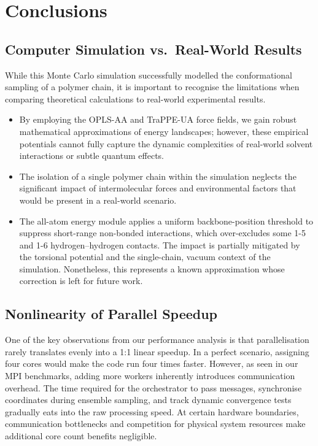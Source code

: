

\section{Conclusions}
\label{sec:conclusions}

\subsection{Computer Simulation vs.\ Real-World Results}

While this Monte Carlo simulation successfully modelled the
conformational sampling of a polymer chain, it is important to
recognise the limitations when comparing theoretical calculations
to real-world experimental results.

\begin{itemize}
  \item By employing the OPLS-AA and TraPPE-UA force fields, we gain
    robust mathematical approximations of energy landscapes; however,
    these empirical potentials cannot fully capture the dynamic
    complexities of real-world solvent interactions or subtle quantum
    effects.
  \item The isolation of a single polymer chain within the simulation
    neglects the significant impact of intermolecular forces and
    environmental factors that would be present in a real-world
    scenario.
  \item The all-atom energy module applies a uniform backbone-position threshold
    to suppress short-range non-bonded interactions, which over-excludes some 1-5 and 1-6 hydrogen--hydrogen contacts. The impact is partially mitigated by the torsional potential and the single-chain, vacuum context of the simulation. Nonetheless, this represents a known approximation whose correction is left for future work.
\end{itemize}

\subsection{Nonlinearity of Parallel Speedup}

One of the key observations from our performance analysis is that
parallelisation rarely translates evenly into a 1:1 linear speedup.
In a perfect scenario, assigning four cores would make the code run
four times faster. However, as seen in our MPI benchmarks, adding
more workers inherently introduces communication overhead. The time
required for the orchestrator to pass messages, synchronise
coordinates during ensemble sampling, and track dynamic convergence
tests gradually eats into the raw processing speed. At certain
hardware boundaries, communication bottlenecks and competition for
physical system resources make additional core count benefits
negligible.

